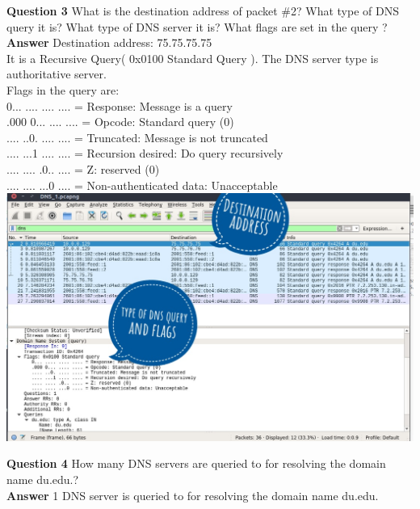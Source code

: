 \documentclass[14pt]{extarticle}
\begin{document}
    \noindent
    \textbf{\large Question 3}
    What is the destination address of packet \#2? What type of DNS query it is? 
    What type of DNS server it is? What flags are set in the query ?\\[10pt]
    \textbf{\large Answer}
    Destination address: 75.75.75.75\\
    It is a Recursive Query( 0x0100 Standard Query ). The DNS server type is authoritative server.\\
    Flags in the query are:\\
    0... .... .... .... = Response: Message is a query\\
    .000 0... .... .... = Opcode: Standard query (0)\\
    .... ..0. .... .... = Truncated: Message is not truncated\\
    .... ...1 .... .... = Recursion desired: Do query recursively\\
    .... .... .0.. .... = Z: reserved (0)\\
    .... .... ...0 .... = Non-authenticated data: Unacceptable\\[10pt]
    \includegraphics[scale=0.45]{1_3}
    \vspace{1cm}


    \noindent
    \textbf{\large Question 4}
    How many DNS servers are queried to for resolving the domain name du.edu.?\\[10pt]
    \textbf{\large Answer}
    1 DNS server is queried to for resolving the domain name du.edu.
    \vspace{1cm}
\end{document}
